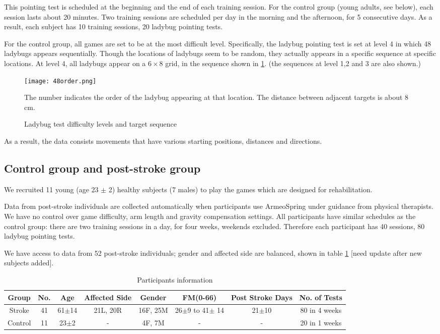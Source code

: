 This pointing test is scheduled at the beginning and the end of each training session. For the control group (young adults, see below), each session lasts about 20 minutes. 
Two training sessions are scheduled per day in the morning and the afternoon, for 5 consecutive days. 
As a result, each subject has 10 training sessions, 20 ladybug pointing tests. 

For the control group, all games are set to be at the most difficult level. 
Specifically, the ladybug pointing test is set at level 4 in which 48 ladybugs appears sequentially. 
Though the locations of ladybugs seem to be random, they actually appears in a specific sequence at specific locations. 
At level 4, all ladybugs appear on a $6\times8$ grid, in the sequence shown in \ref{fig:48order}. (the sequences at level 1,2 and 3 are also shown.) 

\begin{figure}
	\texttt{[image: 48order.png]}
	\centering
	\caption{Ladybug test difficulty levels and target sequence}
	\medskip
	\small The number indicates the order of the ladybug appearing at that location. The distance between adjacent targets is about 8 cm.
	\label{fig:48order}
\end{figure}

As a result, the data consists movements that have various starting positions, distances and directions.

\subsection{Control group and post-stroke group}

We recruited 11 young (age 23 $\pm$ 2) healthy subjects (7 males) to play the games which are designed for rehabilitation.

Data from post-stroke individuals are collected automatically when participants use ArmeoSpring under guidance from physical therapists. 
We have no control over game difficulty, arm length and gravity compensation settings. 
All participants have similar schedules as the control group: there are two training sessions in a day, for four weeks, weekends excluded. Therefore each participant has 40 sessions, 80 ladybug pointing tests.

We have access to data from 52 post-stroke individuals; gender and affected side are balanced, shown in table \ref{tab:demog} [need update after new subjects added]. 

\begin{table}[b]
	\begin{tabular}{c c c c c c c c}
	\hline
	Group & No. & Age & Affected Side & Gender & FM(0-66) & Post Stroke Days & No. of Tests\\
	\hline
	Stroke & 41 & 61$\pm$14 & 21L, 20R & 16F, 25M & 26$\pm$9 to 41$\pm$ 14 & 21$\pm$10 & 80 in 4 weeks \\ 
	Control & 11 & 23$\pm$2 & - & 4F, 7M & - & - & 20 in 1 weeks \\
	\hline
	\end{tabular}
	\caption{Participants information}
	\label{tab:demog}
\end{table}

